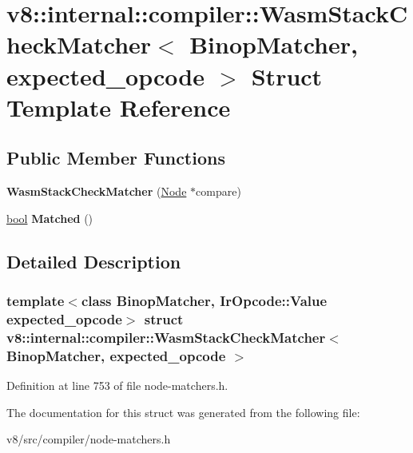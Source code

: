 \hypertarget{structv8_1_1internal_1_1compiler_1_1WasmStackCheckMatcher}{}\section{v8\+:\+:internal\+:\+:compiler\+:\+:Wasm\+Stack\+Check\+Matcher$<$ Binop\+Matcher, expected\+\_\+opcode $>$ Struct Template Reference}
\label{structv8_1_1internal_1_1compiler_1_1WasmStackCheckMatcher}
\subsection*{Public Member Functions}
\begin{DoxyCompactItemize}
\item 
\mbox{\label{structv8_1_1internal_1_1compiler_1_1WasmStackCheckMatcher_a09f57adbf576dc8073cb9844da47f0c7}} 
{\bfseries Wasm\+Stack\+Check\+Matcher} (\mbox{\hyperlink{classv8_1_1internal_1_1compiler_1_1Node}{Node}} $\ast$compare)
\item 
\mbox{\label{structv8_1_1internal_1_1compiler_1_1WasmStackCheckMatcher_a7a6ded81a6eb8dc1febb0d2604200213}} 
\mbox{\hyperlink{classbool}{bool}} {\bfseries Matched} ()
\end{DoxyCompactItemize}


\subsection{Detailed Description}
\subsubsection*{template$<$class Binop\+Matcher, Ir\+Opcode\+::\+Value expected\+\_\+opcode$>$\newline
struct v8\+::internal\+::compiler\+::\+Wasm\+Stack\+Check\+Matcher$<$ Binop\+Matcher, expected\+\_\+opcode $>$}



Definition at line 753 of file node-\/matchers.\+h.



The documentation for this struct was generated from the following file\+:\begin{DoxyCompactItemize}
\item 
v8/src/compiler/node-\/matchers.\+h\end{DoxyCompactItemize}
